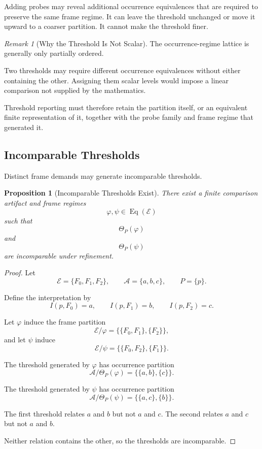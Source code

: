 \documentclass[11pt]{article}
\theoremstyle{plain}
\newtheorem{proposition}[theorem]{Proposition}
\theoremstyle{definition}
\theoremstyle{remark}
\newtheorem{remark}[theorem]{Remark}
\begin{document}
Adding probes may reveal additional occurrence equivalences
that are required to preserve the same frame regime.
It can leave the threshold unchanged
or move it upward to a coarser partition.
It cannot make the threshold finer.

\begin{remark}[Why the Threshold Is Not Scalar]
  \label{ik.rem.threshold-not-scalar}
  The occurrence-regime lattice is generally only partially ordered.

  Two thresholds may require different occurrence equivalences
  without either containing the other.
  Assigning them scalar levels would impose
  a linear comparison not supplied by the mathematics.

  Threshold reporting must therefore retain
  the partition itself,
  or an equivalent finite representation of it,
  together with the probe family
  and frame regime that generated it.
\end{remark}

\subsection{Incomparable Thresholds}

Distinct frame demands may generate incomparable thresholds.

\begin{proposition}[Incomparable Thresholds Exist]
  \label{ik.prop.incomparable-thresholds}
  There exist a finite comparison artifact
  and frame regimes
  \[
    \varphi,\psi
    \in
    \operatorname{Eq}(\mathcal{E})
  \]
  such that
  \[
    \Theta_P(\varphi)
  \]
  and
  \[
    \Theta_P(\psi)
  \]
  are incomparable under refinement.
\end{proposition}

\begin{proof}
  Let
  \[
    \mathcal{E}
    =
    \{F_0,F_1,F_2\},
    \qquad
    \mathcal{A}
    =
    \{a,b,c\},
    \qquad
    P
    =
    \{p\}.
  \]

  Define the interpretation by
  \[
    I(p,F_0)=a,
    \qquad
    I(p,F_1)=b,
    \qquad
    I(p,F_2)=c.
  \]

  Let \(\varphi\) induce the frame partition
  \[
    \mathcal{E}/\varphi
    =
    \bigl\{
    \{F_0,F_1\},
    \{F_2\}
    \bigr\},
  \]
  and let \(\psi\) induce
  \[
    \mathcal{E}/\psi
    =
    \bigl\{
    \{F_0,F_2\},
    \{F_1\}
    \bigr\}.
  \]

  The threshold generated by \(\varphi\)
  has occurrence partition
  \[
    \mathcal{A}/\Theta_P(\varphi)
    =
    \bigl\{
    \{a,b\},
    \{c\}
    \bigr\}.
  \]

  The threshold generated by \(\psi\)
  has occurrence partition
  \[
    \mathcal{A}/\Theta_P(\psi)
    =
    \bigl\{
    \{a,c\},
    \{b\}
    \bigr\}.
  \]

  The first threshold relates \(a\) and \(b\)
  but not \(a\) and \(c\).
  The second relates \(a\) and \(c\)
  but not \(a\) and \(b\).

  Neither relation contains the other,
  so the thresholds are incomparable.
\end{proof}
\end{document}

